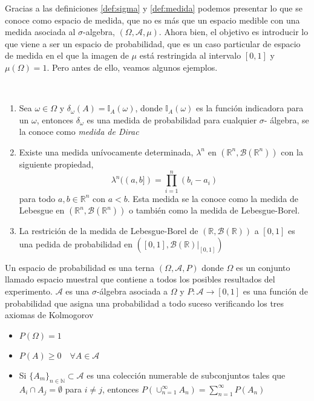      
     Gracias a las definiciones \ref{def:sigma} y \ref{def:medida} podemos presentar lo que se conoce como espacio de medida, que no es más que un espacio medible con una medida asociada al $\sigma$-algebra, $(\Omega,\mathcal{A},\mu)$. Ahora bien, el objetivo es introducir lo que viene a ser un espacio de probabilidad, que es un caso particular de espacio de medida en el que la imagen de $\mu$ está restringida al intervalo $[0,1]$ y $\mu(\Omega)=1$. Pero antes de ello, veamos algunos ejemplos.
     
     
    \begin{ejemplo}~\smallskip
       \begin{enumerate}
           \item Sea $\omega \in \Omega$ y $\delta_{\omega}(A) = \mathbb{I}_A(\omega)$, donde $\mathbb{I}_A(\omega)$ es la función indicadora para un $\omega$,  entonces $\delta_{\omega}$ es una medida de probabilidad para cualquier $\sigma$- álgebra, se la conoce como \textit{medida de Dirac} 
           
           \item Existe una medida unívocamente determinada, $\lambda^n$ en $(\mathbb{R}^n,\mathcal{B}(\mathbb{R}^n))$ con la siguiente propiedad,
           $$\lambda^n((a,b]) = \prod_{i=1}^n(b_i-a_i)$$
           para todo $a,b \in \mathbb{R}^n$ con $a<b$. Esta medida se la conoce como la medida de Lebesgue  en $(\mathbb{R}^n,\mathcal{B}(\mathbb{R}^n))$ o también como la medida de Lebesgue-Borel.
           
           \item La restrición de la medida de Lebesgue-Borel de $(\mathbb{R},\mathcal{B}(\mathbb{R}))$ a $[0,1]$ es una pedida de probabilidad en $([0,1],\mathcal{B}(\mathbb{R})|_{[0,1]})$
       \end{enumerate}
       \end{ejemplo}
     
     
    \begin{definicion}
        Un espacio de probabilidad es una terna $(\Omega,\mathcal{A},P)$ donde $\Omega$ es un conjunto llamado espacio muestral que contiene a todos los posibles resultados del experimento. $\mathcal{A}$ es una $\sigma$-álgebra asociada a $\Omega$ y ${P:\mathcal{A}\rightarrow [0,1]}$ es una función de probabilidad que asigna una probabilidad a todo suceso verificando los tres axiomas de Kolmogorov
        
        \begin{itemize}
            \item $P(\Omega)=1$
            \item $P(A) \geq 0 \quad \forall A \in \mathcal{A}$
            \item Si $\{A_m\}_{n\in\mathbb{N}} \subset \mathcal{A}$ es una colección numerable de subconjuntos tales que ${A_i \cap A_j = \emptyset}$ para $i\not=j$, entonces $P(\cup^{\infty}_{n=1}A_n) = \sum^{\infty}_{n=1} P(A_n)$
        \end{itemize}
      \end{definicion}
      
